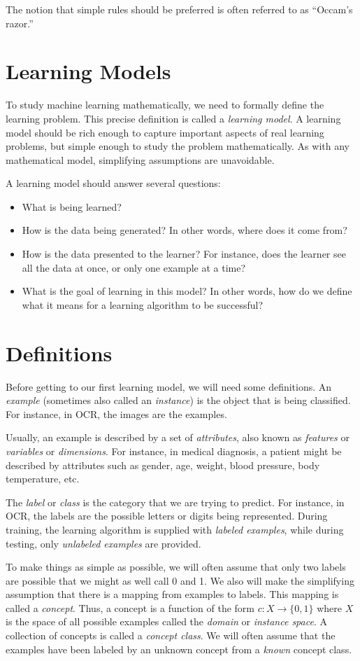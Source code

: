 \documentclass[11pt]{article}
\begin{document}
The notion that simple rules should be preferred is often referred to
as ``Occam's razor.''

\section{Learning Models}

To study machine learning mathematically, we need to formally define
the learning problem.
This precise definition is called a {\em learning model}.
A learning model should be rich enough to capture important aspects of
real learning problems, but simple enough to study the problem
mathematically.
As with any mathematical model, simplifying assumptions are
unavoidable.

A learning model should answer several questions:
\begin{itemize}
\item
What is being learned?
\item
How is the data being generated?
In other words, where does it come from?
\item
How is the data presented to the learner?
For instance, does the learner see all the data at once, or only one
example at a time?
\item
What is the goal of learning in this model?
In other words, how do we define what it means for a learning
algorithm to be successful?
\end{itemize}

\section{Definitions}

Before getting to our first learning model, we will need some
definitions.
An {\em example} (sometimes also called an {\em instance}) is the
object that is being classified.
For instance, in OCR, the images are the examples.

Usually, an example is described by a set of {\em attributes}, also
known as {\em features} or {\em variables} or {\em dimensions}.
For instance, in medical diagnosis, a patient might be described by
attributes such as gender, age, weight, blood pressure, body
temperature, etc.

The {\em label} or {\em class} is the category that we are trying to
predict.
For instance, in OCR, the labels are the possible letters or digits
being represented.
During training, the learning algorithm is supplied with {\em labeled
examples}, while during testing, only {\em unlabeled examples} are
provided.

To make things as simple as possible, we will often assume that only
two labels are possible that we might as well call 0 and 1.
We also will make the simplifying assumption that there is a mapping
from examples to labels.
This mapping is called a {\em concept}.
Thus, a concept is a function of the form $c: X\rightarrow \{0,1\}$
where $X$ is the space of all possible examples called the {\em
domain} or {\em instance space}.
A collection of concepts is called a {\em concept class}.
We will often assume that the examples have been labeled by an unknown
concept from a {\em known} concept class.

\end{document}
